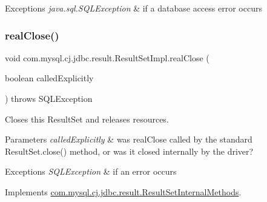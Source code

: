 \begin{DoxyExceptions}{Exceptions}
{\em java.\+sql.\+S\+Q\+L\+Exception} & if a database access error occurs \\
\hline
\end{DoxyExceptions}
\mbox{\label{classcom_1_1mysql_1_1cj_1_1jdbc_1_1result_1_1_result_set_impl_a33dfcef00d2e567cee58610ade647321}} 
\subsubsection{\texorpdfstring{real\+Close()}{realClose()}}
{\footnotesize\ttfamily void com.\+mysql.\+cj.\+jdbc.\+result.\+Result\+Set\+Impl.\+real\+Close (\begin{DoxyParamCaption}\item[{boolean}]{called\+Explicitly }\end{DoxyParamCaption}) throws S\+Q\+L\+Exception}

Closes this Result\+Set and releases resources.


\begin{DoxyParams}{Parameters}
{\em called\+Explicitly} & was real\+Close called by the standard Result\+Set.\+close() method, or was it closed internally by the driver?\\
\hline
\end{DoxyParams}

\begin{DoxyExceptions}{Exceptions}
{\em S\+Q\+L\+Exception} & if an error occurs \\
\hline
\end{DoxyExceptions}


Implements \mbox{\hyperlink{interfacecom_1_1mysql_1_1cj_1_1jdbc_1_1result_1_1_result_set_internal_methods_a0102042bd0710772308db537f40e2286}{com.\+mysql.\+cj.\+jdbc.\+result.\+Result\+Set\+Internal\+Methods}}.

\mbox{\label{classcom_1_1mysql_1_1cj_1_1jdbc_1_1result_1_1_result_set_impl_ac9fac0fdfce19c2d4a1cb5ff55e03ec5}} 
